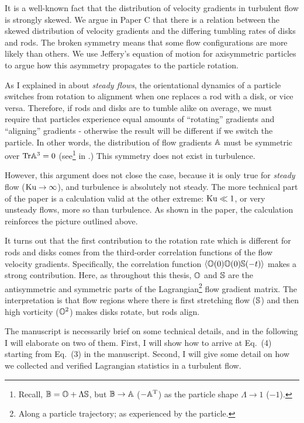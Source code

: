 \documentclass[thesis.tex]{subfiles}
\begin{document}
It is a well-known fact that the distribution of velocity gradients in turbulent flow is strongly skewed\cite{pumirskewed}. We argue in Paper C that there is a relation between the skewed distribution of velocity gradients and the differing tumbling rates of disks and rods. The broken symmetry means that some flow configurations are more likely than others. We use Jeffery's equation of motion for axisymmetric particles to argue how this asymmetry propagates to the particle rotation. 

As I explained in  about \emph{steady flows}, the orientational dynamics of a particle switches from rotation to alignment when one replaces a rod with a disk, or vice versa. Therefore, if rods and disks are to tumble alike on average, we must require that particles experience equal amounts of ``rotating'' gradients and ``aligning'' gradients - otherwise the result will be different if we switch the particle.
In other words, the distribution of flow gradients $\mathbb{A}$ must be symmetric over $\mbox{Tr} \mathbb{A}^3=0$ (see\footnote{Recall, $\mathbb{B}=\mathbb{O} + \Lambda\mathbb{S}$, but $\mathbb{B} \to \mathbb{A}$ ($-\mathbb{A}^{\mathrm T}$) as the particle shape $\Lambda\to 1$ ($-1$).}  in .) This symmetry does not exist in turbulence.

However, this argument does not close the case, because it is only true for \emph{steady} flow ($\mbox{Ku}\to\infty$), and turbulence is absolutely not steady. The more technical part of the paper is a calculation valid at the other extreme: $\mbox{Ku} \ll 1$, or very unsteady flows, more so than turbulence. As shown in the paper, the calculation reinforces the picture outlined above.

It turns out that the first contribution to the rotation rate which is different for rods and disks comes from the third-order correlation functions of the flow velocity gradients. Specifically, the correlation function $\langle \mathbb{O}(0) \mathbb{O}(0) \mathbb{S}(-t)\rangle$ makes a strong contribution. Here, as throughout this thesis, $\mathbb{O}$ and $\mathbb{S}$ are the antisymmetric and symmetric parts of the Lagrangian\footnote{Along a particle trajectory; as experienced by the particle.} flow gradient matrix. The interpretation is that flow regions where there is first stretching flow ($\mathbb{S}$) and then high vorticity ($\mathbb{O}^2$) makes disks rotate, but rods align.

The manuscript is necessarily brief on some technical details, and in the following I will elaborate on two of them. First, I will show how to arrive at Eq.~(4) starting from Eq.~(3) in the manuscript. Second, I will give some detail on how we collected and verified Lagrangian statistics in a turbulent flow. 
\end{document}
